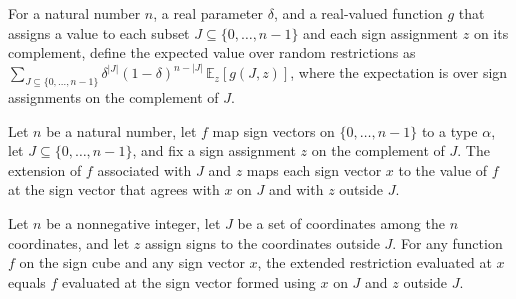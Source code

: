 \begin{definition}
\label{FABL.expectRandomRestriction}
\leanok
{}
For a natural number $n$, a real parameter $\delta$, and a real-valued function $g$ that
assigns a value to each subset $J\subseteq\{0,\ldots,n-1\}$ and each sign assignment $z$
on its complement, define the expected value over random restrictions as
$\sum_{J\subseteq\{0,\ldots,n-1\}}\delta^{|J|}(1-\delta)^{n-|J|}\,\mathbb{E}_{z}[g(J,z)]$,
where the expectation is over sign assignments on the complement of $J$.
\end{definition}

\begin{definition}
\label{FABL.extendedSignRestriction}
\leanok
{}
Let $n$ be a natural number, let $f$ map sign vectors on $\{0,\ldots,n-1\}$ to a type
$\alpha$, let $J\subseteq\{0,\ldots,n-1\}$, and fix a sign assignment $z$ on the
complement of $J$. The extension of $f$ associated with $J$ and $z$ maps each sign
vector $x$ to the value of $f$ at the sign vector that agrees with $x$ on $J$ and with
$z$ outside $J$.
\end{definition}

\begin{theorem}
\label{FABL.extendedSignRestriction_apply}
\leanok
{}
Let $n$ be a nonnegative integer, let $J$ be a set of coordinates among the $n$
coordinates, and let $z$ assign signs to the coordinates outside $J$. For any function
$f$ on the sign cube and any sign vector $x$, the extended restriction evaluated at $x$
equals $f$ evaluated at the sign vector formed using $x$ on $J$ and $z$ outside $J$.
\end{theorem}

